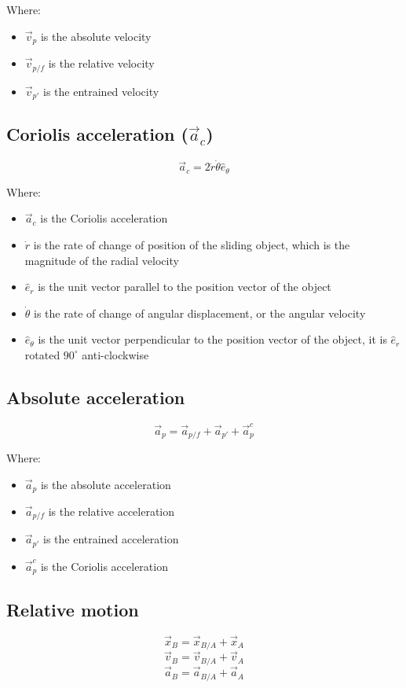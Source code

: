 \documentclass[11pt]{article}
\begin{document}
Where:
\begin{itemize}
\item \(\vec{v}_p\) is the absolute velocity
\item \(\vec{v}_{p/f}\) is the relative velocity
\item \(\vec{v}_{p'}\) is the entrained velocity
\end{itemize}

 \newpage
\subsection{Coriolis acceleration (\(\vec{a}_c\))}
\label{sec:orgcc82c4d}
\[\vec{a}_c = 2 \dot{r} \dot{\theta} \hat{e}_{\theta}\]

Where:
\begin{itemize}
\item \(\vec{a}_c\) is the Coriolis acceleration
\item \(\dot{r}\) is the rate of change of position of the sliding object, which is the magnitude of the radial velocity
\item \(\hat{e}_r\) is the unit vector parallel to the position vector of the object
\item \(\dot{\theta}\) is the rate of change of angular displacement, or the angular velocity
\item \(\hat{e}_{\theta}\) is the unit vector perpendicular to the position vector of the object, it is \(\hat{e}_r\) rotated \(90^{\circ}\) anti-clockwise
\end{itemize}
\subsection{Absolute acceleration}
\label{sec:org6140106}
\[\vec{a}_p = \vec{a}_{p/f} + \vec{a}_{p'} + \vec{a}_p^c\]

Where:
\begin{itemize}
\item \(\vec{a}_p\) is the absolute acceleration
\item \(\vec{a}_{p/f}\) is the relative acceleration
\item \(\vec{a}_{p'}\) is the entrained acceleration
\item \(\vec{a}_p^c\) is the Coriolis acceleration
\end{itemize}

 \newpage
\subsection{Relative motion}
\label{sec:org9c87ef6}
\[\vec{x}_B = \vec{x}_{B/A} + \vec{x}_A\]
\[\vec{v}_B = \vec{v}_{B/A} + \vec{v}_A\]
\[\vec{a}_B = \vec{a}_{B/A} + \vec{a}_A\]
\end{document}
